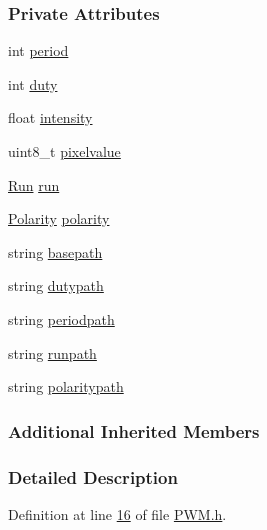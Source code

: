 \subsubsection*{Private Attributes}
\begin{DoxyCompactItemize}
\item 
int \hyperlink{class_hardware_1_1_p_w_m_a91323a511e37d396f46d08f4159ef761}{period}
\item 
int \hyperlink{class_hardware_1_1_p_w_m_a3309b2645c4c817384d91f33f0df5d64}{duty}
\item 
float \hyperlink{class_hardware_1_1_p_w_m_afcfc81ddeeb9c510ad4d00b215477d7a}{intensity}
\item 
uint8\+\_\+t \hyperlink{class_hardware_1_1_p_w_m_a27de0bd1068a57a970d21bbbe4fc0872}{pixelvalue}
\item 
\hyperlink{class_hardware_1_1_p_w_m_a6f1e614731154a3613c03a4238ddd107}{Run} \hyperlink{class_hardware_1_1_p_w_m_a04531646b41accced24d46046c4bc7de}{run}
\item 
\hyperlink{class_hardware_1_1_p_w_m_a728111433109229b4da1efc953a107c1}{Polarity} \hyperlink{class_hardware_1_1_p_w_m_ad346586d086f8462c3de6a4c19edb1d3}{polarity}
\item 
string \hyperlink{class_hardware_1_1_p_w_m_a344f82a0812dceb40aa48d4789d09c68}{basepath}
\item 
string \hyperlink{class_hardware_1_1_p_w_m_a53311e9df6960751465d5f0b81192226}{dutypath}
\item 
string \hyperlink{class_hardware_1_1_p_w_m_a27e17a6c2e9720c571d5939f1a9ffb12}{periodpath}
\item 
string \hyperlink{class_hardware_1_1_p_w_m_ac1eb93467481ee2bd3565f1be47b8a01}{runpath}
\item 
string \hyperlink{class_hardware_1_1_p_w_m_ace89c96484ffa9d6c9f3a8067848bf51}{polaritypath}
\end{DoxyCompactItemize}
\subsubsection*{Additional Inherited Members}


\subsubsection{Detailed Description}


Definition at line \hyperlink{_p_w_m_8h_source_l00016}{16} of file \hyperlink{_p_w_m_8h_source}{P\+W\+M.\+h}.



